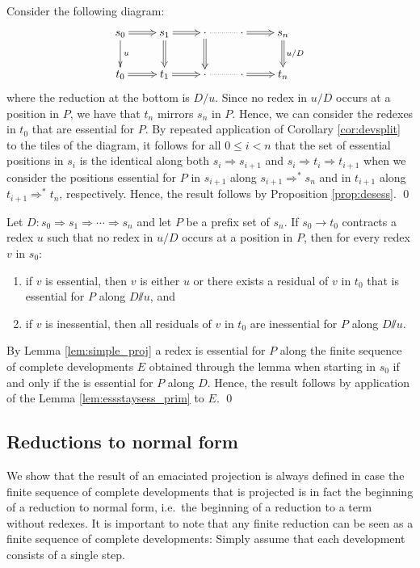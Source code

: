 \documentclass{LMCS}
\theoremstyle{definition}
\newcommand{\rew}{\rightarrow}
\newcommand{\emmy}{\mathord{\sslash}}
\newcommand{\dev}{\Rightarrow}
\begin{document}
\proof
Consider the following diagram:
\[
\xymatrix{
s_0 \ar@{=>}[r] \ar[d]^{u}
  & s_1 \ar@{=>}[r] \ar@{=>}[d]
  & \cdot \ar@{.}[r] \ar@{=>}[d]
  & \cdot \ar@{=>}[r]
  & s_n \ar@{=>}[d]^{u/D} \\
t_0 \ar@{=>}[r]
  & t_1 \ar@{=>}[r]
  & \cdot \ar@{.}[r]
  & \cdot \ar@{=>}[r]
  & t_n
}
\]
where the reduction at the bottom is $D/u$. Since no redex in $u/D$ occurs at a position in $P$, we have that $t_n$ mirrors $s_n$ in $P$. Hence, we can consider the redexes in $t_0$ that are essential for $P$. By repeated application of Corollary \ref{cor:devsplit} to the tiles of the diagram, it follows for all $0 \leq i < n$ that the set of essential positions in $s_i$ is the identical along both $s_i \dev s_{i + 1}$ and $s_i \dev t_i \dev t_{i + 1}$ when we consider the positions essential for $P$ in $s_{i + 1}$ along $s_{i + 1} \dev^* s_n$ and in $t_{i + 1}$ along $t_{i + 1} \dev^* t_n$, respectively. Hence, the result follows by Proposition \ref{prop:desess}.
\qed

\begin{lem}
\label{lem:essstaysess}
Let $D : s_0 \dev s_1 \dev \cdots \dev s_n$ and let $P$ be a prefix set of $s_n$. If $s_0 \rew t_0$ contracts a redex $u$ such that no redex in $u/D$ occurs at a position in $P$, then for every redex $v$ in $s_0$:
\begin{enumerate}[$\bullet$]
\item

if $v$ is essential, then $v$ is either $u$ or there exists a residual of $v$ in $t_0$ that is essential for $P$ along $D \emmy u$, and
\item
if $v$ is inessential, then all residuals of $v$ in $t_0$ are inessential for $P$ along $D \emmy u$.
\end{enumerate}
\end{lem}

\proof
By Lemma \ref{lem:simple_proj} a redex is essential for $P$ along the finite sequence of complete developments $E$ obtained through the lemma when starting in $s_0$ if and only if the is essential for $P$ along $D$. Hence, the result follows by application of the Lemma \ref{lem:essstaysess_prim} to $E$.
\qed

\subsection{Reductions to normal form}
\label{sec:nf_emmy}

We show that the result of an emaciated projection is always defined in case the finite sequence of complete developments that is projected is in fact the beginning of a reduction to normal form, i.e.\ the beginning of a reduction to a term without redexes. It is important to note that any finite reduction can be seen as a finite sequence of complete developments: Simply assume that each development consists of a single step.
\end{document}
